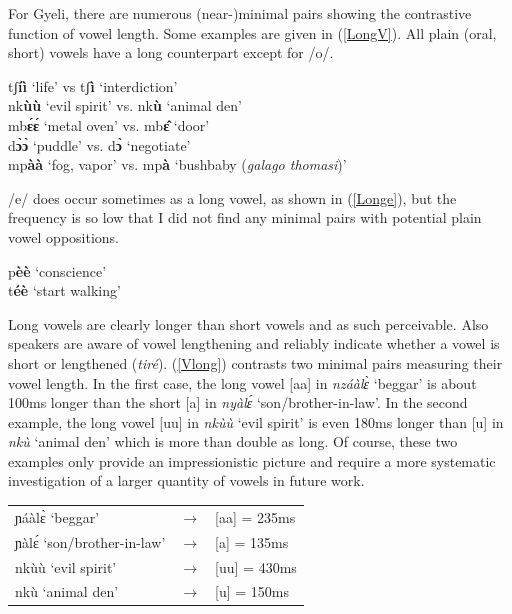 \noindent For Gyeli, there are numerous (near-)minimal pairs showing the contrastive function of vowel length. Some examples are given in (\ref{LongV}). All plain (oral, short) vowels have a long counterpart except for /o/. 

\begin{exe} \ex \label{LongV}
tʃ{\bfseries íì} `life' vs tʃ{\bfseries ì} `interdiction' \\
nk{\bfseries ùù} `evil spirit' vs. nk{\bfseries ù} `animal den' \\
mb{\bfseries ɛ́ɛ́} `metal oven' vs. mb{\bfseries ɛ̂} `door' \\
d{\bfseries ɔ̀ɔ̀} `puddle' vs. d{\bfseries ɔ̀} `negotiate' \\
mp{\bfseries àà} `fog, vapor' vs. mp{\bfseries à} `bushbaby ({\itshape galago thomasi})' \\
\end{exe}

/e/ does occur sometimes as a long vowel, as shown in (\ref{Longe}), but the frequency is so low that I did not find any minimal pairs with potential plain vowel oppositions.

\begin{exe} \ex \label{Longe}
p{\bfseries èè} `conscience' \\
t{\bfseries éè} `start walking'
\end{exe}

Long vowels are clearly longer than short vowels and as such perceivable. Also speakers are aware of vowel lengthening and reliably indicate whether a vowel is short or lengthened ({\itshape tiré}). (\ref{Vlong}) contrasts two minimal pairs measuring their vowel length. In the first case, the long vowel [aa] in {\itshape nzáàlɛ̀} `beggar' is about 100ms longer than the short [a] in {\itshape nyàlɛ́} `son/brother-in-law'. In the second example, the long vowel [uu] in {\itshape nkùù} `evil spirit' is even 180ms longer than [u] in {\itshape nkù} `animal den' which is more than double as long. Of course, these two examples only provide an impressionistic picture and require a more systematic investigation of a larger quantity of vowels in future work.

\begin{exe} \ex \label{Vlong}
\begin{tabular}{lll}
ɲáàlɛ̀ `beggar' & $\rightarrow$ & [aa] = 235ms\\
ɲàlɛ́ `son/brother-in-law' & $\rightarrow$ & [a] = 135ms \\
nkùù `evil spirit' &  $\rightarrow$ & [uu] = 430ms\\
nkù `animal den' &  $\rightarrow$ & [u] = 150ms\\
\end{tabular}
\end{exe}

